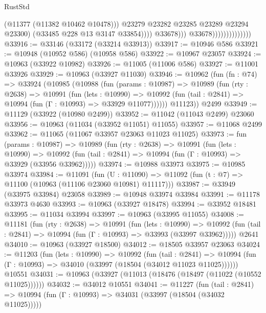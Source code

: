 \begin{lexlean}{RustStd}
\begin{coremodule}
                                                (@11377 (@11382 @10462 @10478)))
                                              @23279
                                              @23282
                                              @23285
                                              @23289
                                              @23294
                                              @23300)
                                            (@33485 @228 @13 @3147 @33854))))
                                      @33678)))
                                @33678))))))))))))))
@33916 := @33146 (@33172 (@33214 @33913))
@33917 := @10946 @586
@33921 := @10948 (@10952 @586) (@10958 @586)
@33922 := @10967 @23057
@33924 := @10963 (@33922 @10982)
@33926 := @11005 (@11006 @586)
@33927 := @11001 @33926
@33929 := @10963 (@33927 @11030)
@33946 := @10962
    (fun (fn : @74) =>
    @33924
      (@10985
        (@10988
          (fun (params : @10987) =>
          @10989
            (fun (rty : @2638) =>
            @10991
              (fun (lets : @10990) =>
              @10992 (fun (tail : @2841) => @10994 (fun (Γ : @10993) => @33929 @11077))))))
        @11123))
    @2499
@33949 := @11129 (@33922 (@10980 @2499))
@33952 := @11042 (@11043 @2499) @23060
@33956 := @10963 (@11034 (@33952 @11051) @11055)
@33957 := @11068 @2499
@33962 := @11065 (@11067 @33957 @23063 @11023 @11025)
@33973 := fun (params : @10987) =>
  @10989
    (fun (rty : @2638) =>
    @10991
      (fun (lets : @10990) =>
      @10992 (fun (tail : @2841) => @10994 (fun (Γ : @10993) => @33929 (@33956 @33962)))))
@33974 := @10988 @33973
@33975 := @10985 @33974
@33984 := @11091
    (fun (U : @11090) => @11092 (fun (t : @7) => @11100 (@10963 (@11106 @23060 @10981) @11117)))
@33987 := @33949 (@33975 @33984) @23058
@33989 := @10948 @33974 @33984
@33991 := @11178 @33973 @4630
@33993 := @10963 (@33927 @18478)
@33994 := @33952 @18481
@33995 := @11034 @33994
@33997 := @10963 (@33995 @11055)
@34008 := @11181
    (fun (rty : @2638) =>
    @10991
      (fun (lets : @10990) =>
      @10992 (fun (tail : @2841) => @10994 (fun (Γ : @10993) => @33993 (@33997 @33962)))))
    @2641
@34010 := @10963 (@33927 @18500)
@34012 := @18505 @33957 @23063
@34024 := @11203
    (fun (lets : @10990) =>
    @10992
      (fun (tail : @2841) =>
      @10994 (fun (Γ : @10993) => @34010 (@33997 (@18504 (@34012 @11023 @11025))))))
    @10551
@34031 := @10963 (@33927 (@11013 (@18476 (@18497 (@11022 (@10552 @11025))))))
@34032 := @34012 @10551
@34041 := @11227
    (fun (tail : @2841) => @10994 (fun (Γ : @10993) => @34031 (@33997 (@18504 (@34032 @11025)))))

\end{coremodule}
\end{lexlean}
